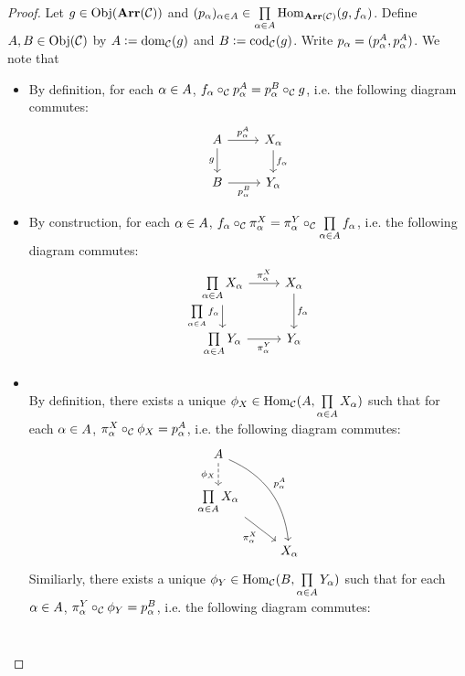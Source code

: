 \documentclass{book}
\begin{document}
	\begin{proof}
		Let $g \in \operatorname{Obj}(\operatorname{\textbf{Arr}}(\mathcal{C}))$ and $(p_{\alpha})_{\alpha \in A} \in \prod\limits_{\alpha \in A} \operatorname{Hom}_{\operatorname{\textbf{Arr}}(\mathcal{C})}(g, f_{\alpha})$. Define $A,B \in \operatorname{Obj}(\mathcal{C})$ by $A \vcentcolon= \operatorname{dom}_{\mathcal{C}}(g)$ and $B \vcentcolon= \operatorname{cod}_{\mathcal{C}}(g)$. Write $p_{\alpha} = (p^A_{\alpha}, p^A_{\alpha})$. We note that 
		\begin{itemize}
			\item By definition, for each $\alpha \in A$, $f_{\alpha} \circ_{\mathcal{C}} p^A_{\alpha} = p^B_{\alpha} \circ_{\mathcal{C}} g$, i.e. the following diagram commutes:
			\[ 
			\begin{tikzcd}[baseline= 7]
				A  \arrow[r, "p^A_{\al}"]  \arrow[d, "g"']  & X_{\al}   \arrow[d, "f_{\al}"]\\
				B \arrow[r, "p^B_{\al}"'] &  Y_{\al}
			\end{tikzcd}
			\]
			\item By construction, for each $\alpha \in A$, $f_{\alpha} \circ_{\mathcal{C}} \pi^X_{\alpha} = \pi^Y_{\alpha} \circ_{\mathcal{C}} \prod\limits_{\alpha \in A} f_{\alpha}$, i.e. the following diagram commutes:
			\[ 
			\begin{tikzcd}[baseline= 7]
				\prod\limits_{\al \in A} X_{\al}  \arrow[r, "\pi^X_{\al}"]  \arrow[d, "\prod\limits_{\al \in A} f_{\al}"']  & X_{\al}   \arrow[d, "f_{\al}"]\\
				\prod\limits_{\al \in A} Y_{\al} \arrow[r, "\pi^Y_{\al}"'] &  Y_{\al}
			\end{tikzcd}
			\]
		\end{itemize}
		\begin{itemize}
			\item {} \\
			By definition, there exists a unique $\phi_X \in \operatorname{Hom}_{\mathcal{C}}(A, \prod\limits_{\alpha \in A} X_{\alpha})$ such that for each $\alpha \in A$, $\pi^X_{\alpha} \circ_{\mathcal{C}} \phi_X = p^A_{\alpha}$, i.e. the following diagram commutes: 
			\[
			\begin{tikzcd}[baseline= 7]
				A   \arrow[d, "\phi_X"', dashed]  \arrow[ddr, "p^A_{\al}"', bend left=30, swap]    &  \\
				\prod\limits_{\al \in A} X_{\al} \arrow[dr, "\pi^X_{\al}"']                        & \\
				& X_{\al}   
			\end{tikzcd}
			\]
			Similiarly, there exists a unique $\phi_Y \in \operatorname{Hom}_{\mathcal{C}}(B, \prod\limits_{\alpha \in A} Y_{\alpha})$ such that for each $\alpha \in A$, $\pi^Y_{\alpha} \circ_{\mathcal{C}} \phi_Y = p^B_{\alpha}$, i.e. the following diagram commutes:
			\[
			\begin{tikzcd}[baseline= 7]

\end{tikzcd}\]
\end{itemize}
\end{proof}
\end{document}
